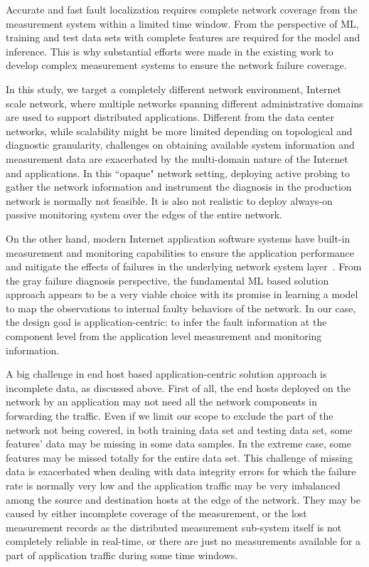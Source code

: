 Accurate and fast fault localization requires complete network coverage from the measurement system within a limited time window. 
From the perspective of ML, training and test data sets with complete features are required for the model and inference. 
This is why substantial efforts were made in the existing work to develop complex measurement systems to ensure the network failure coverage. 

In this study, we target a completely different network environment, Internet scale network, where multiple networks spanning different administrative domains are used to support distributed applications. Different from the data center networks, while scalability might be more limited depending on topological and diagnostic granularity, challenges on obtaining available system information and measurement data are exacerbated by the multi-domain nature of the Internet and applications. In this ``opaque" network setting, deploying active probing to gather the network information and instrument the diagnosis in the production network is normally not feasible. It is also not realistic to deploy always-on passive monitoring system over the edges of the entire network.
 
On the other hand, modern Internet application software systems have built-in measurement and monitoring capabilities to ensure the application performance 
and mitigate the effects of failures in the underlying network system layer~\cite{IntegrityVerification:DataTransfer,swip:pearc:2019,iris:ictc21}. 
From the gray failure diagnosis perspective, the fundamental ML based solution approach appears to be a very viable choice with its promise in learning a model to map the observations to internal faulty behaviors of the network. In our case, the design goal is application-centric: to infer the fault information at the component level from the application level measurement and monitoring information. 

A big challenge in end host based application-centric solution approach is incomplete data, as discussed above. First of all, the end hosts deployed on the network 
by an application may not need all the network components in forwarding the traffic. Even if we limit our scope to exclude the part of the network not being covered,  
in both training data set and testing data set, some features' data may be missing in some data samples. In the extreme case, some features may be missed totally for the entire data set. 
This challenge of missing data is exacerbated when dealing with data integrity errors for which the failure rate is normally very low and the application traffic 
may be very imbalanced among the source and destination hosts at the edge of the network.
They may be caused by either incomplete coverage of the measurement, or the lost measurement records as the distributed measurement 
sub-system itself is not completely reliable in real-time, or there are just no measurements available for a part of application traffic during some time windows. 

